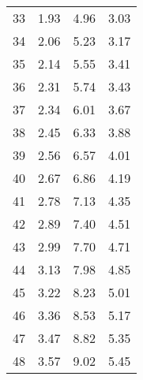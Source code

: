 \begin{longtable}[c]{cccc}
	33                       & 1.93                                    & 4.96                                    & 3.03                       \\
	34                       & 2.06                                    & 5.23                                    & 3.17                       \\
	35                       & 2.14                                    & 5.55                                    & 3.41                       \\
	36                       & 2.31                                    & 5.74                                    & 3.43                       \\
	37                       & 2.34                                    & 6.01                                    & 3.67                       \\
	38                       & 2.45                                    & 6.33                                    & 3.88                       \\
	39                       & 2.56                                    & 6.57                                    & 4.01                       \\
	40                       & 2.67                                    & 6.86                                    & 4.19                       \\
	41                       & 2.78                                    & 7.13                                    & 4.35                       \\
	42                       & 2.89                                    & 7.40                                    & 4.51                       \\
	43                       & 2.99                                    & 7.70                                    & 4.71                       \\
	44                       & 3.13                                    & 7.98                                    & 4.85                       \\
	45                       & 3.22                                    & 8.23                                    & 5.01                       \\
	46                       & 3.36                                    & 8.53                                    & 5.17                       \\
	47                       & 3.47                                    & 8.82                                    & 5.35                       \\
	48                       & 3.57                                    & 9.02                                    & 5.45                       \\

\end{longtable}



